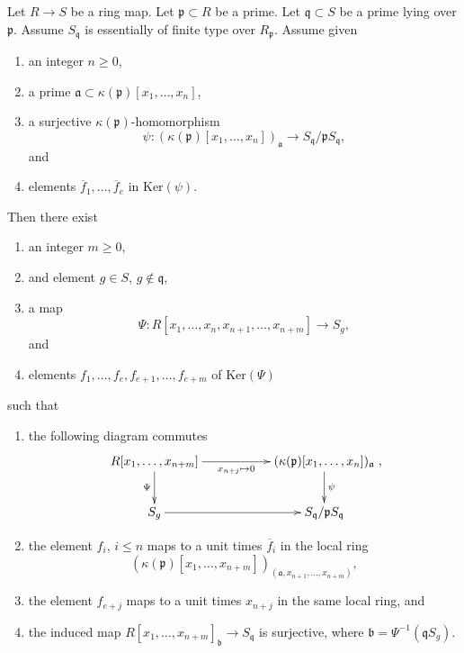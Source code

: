 \begin{lemma}
\label{lemma-lift-elements-ideal}
Let $R \to S$ be a ring map.
Let $\mathfrak p \subset R$ be a prime.
Let $\mathfrak q \subset S$ be a prime lying over $\mathfrak p$.
Assume $S_{\mathfrak q}$ is essentially of finite type over $R_\mathfrak p$.
Assume given
\begin{enumerate}
\item an integer $n \geq 0$,
\item a prime $\mathfrak a \subset \kappa(\mathfrak p)[x_1, \ldots, x_n]$,
\item a surjective $\kappa(\mathfrak p)$-homomorphism
$$
\psi : (\kappa(\mathfrak p)[x_1, \ldots, x_n])_{\mathfrak a}
\longrightarrow
S_{\mathfrak q}/\mathfrak p S_{\mathfrak q},
$$
and
\item elements $\overline{f}_1, \ldots, \overline{f}_e$ in $\text{Ker}(\psi)$.
\end{enumerate}
Then there exist
\begin{enumerate}
\item an integer $m \geq 0$,
\item and element $g \in S$, $g \not\in \mathfrak q$,
\item a map
$$
\Psi :
R[x_1, \ldots, x_n, x_{n + 1}, \ldots, x_{n + m}]
\longrightarrow
S_g,
$$
and
\item elements $f_1, \ldots, f_e, f_{e + 1}, \ldots, f_{e + m}$
of $\text{Ker}(\Psi)$
\end{enumerate}
such that
\begin{enumerate}
\item the following diagram commutes
$$
\xymatrix{
R[x_1, \ldots, x_{n + m}] \ar[d]_\Psi
\ar[rr]_-{x_{n + j} \mapsto 0} & &
(\kappa(\mathfrak p)[x_1, \ldots, x_n])_{\mathfrak a} \ar[d]^\psi \\
S_g \ar[rr] & &
S_{\mathfrak q}/\mathfrak p S_{\mathfrak q}
},
$$
\item the element $f_i$, $i \leq n$ maps to a unit times
$\overline{f}_i$ in the local ring
$$
(\kappa(\mathfrak p)[x_1, \ldots, x_{n + m}])_{
(\mathfrak a, x_{n + 1}, \ldots, x_{n + m})},
$$
\item the element $f_{e + j}$ maps to
a unit times $x_{n + j}$ in the same local ring, and
\item the induced map $R[x_1, \ldots, x_{n + m}]_{\mathfrak b}
\to S_{\mathfrak q}$ is surjective, where
$\mathfrak b = \Psi^{-1}(\mathfrak qS_g)$.
\end{enumerate}
\end{lemma}

